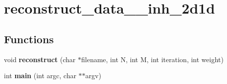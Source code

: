 \hypertarget{group__applications__mri2d__reconstruct__data__inh__2d1d}{
\section{reconstruct\_\-data\_\-\_\-inh\_\-2d1d}
\label{group__applications__mri2d__reconstruct__data__inh__2d1d}
}
\subsection*{Functions}
\begin{CompactItemize}
\item 
\hypertarget{group__applications__mri2d__reconstruct__data__inh__2d1d_ga0}{
void {\bf reconstruct} (char $\ast$filename, int N, int M, int iteration, int weight)}
\label{group__applications__mri2d__reconstruct__data__inh__2d1d_ga0}

\item 
\hypertarget{group__applications__mri2d__reconstruct__data__inh__2d1d_ga1}{
int {\bf main} (int argc, char $\ast$$\ast$argv)}
\label{group__applications__mri2d__reconstruct__data__inh__2d1d_ga1}

\end{CompactItemize}
